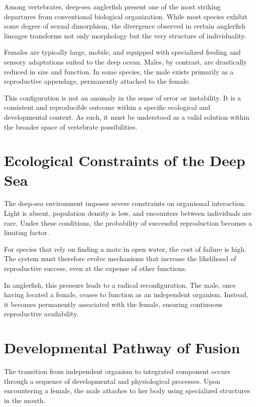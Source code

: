 \documentclass[11pt,oneside]{book}
\begin{document}
Among vertebrates, deep-sea anglerfish present one of the most striking departures from conventional biological organization. While most species exhibit some degree of sexual dimorphism, the divergence observed in certain anglerfish lineages transforms not only morphology but the very structure of individuality.

Females are typically large, mobile, and equipped with specialized feeding and sensory adaptations suited to the deep ocean. Males, by contrast, are drastically reduced in size and function. In some species, the male exists primarily as a reproductive appendage, permanently attached to the female.

This configuration is not an anomaly in the sense of error or instability. It is a consistent and reproducible outcome within a specific ecological and developmental context. As such, it must be understood as a valid solution within the broader space of vertebrate possibilities.

\section{Ecological Constraints of the Deep Sea}

The deep-sea environment imposes severe constraints on organismal interaction. Light is absent, population density is low, and encounters between individuals are rare. Under these conditions, the probability of successful reproduction becomes a limiting factor.

For species that rely on finding a mate in open water, the cost of failure is high. The system must therefore evolve mechanisms that increase the likelihood of reproductive success, even at the expense of other functions.

In anglerfish, this pressure leads to a radical reconfiguration. The male, once having located a female, ceases to function as an independent organism. Instead, it becomes permanently associated with the female, ensuring continuous reproductive availability.

\section{Developmental Pathway of Fusion}

The transition from independent organism to integrated component occurs through a sequence of developmental and physiological processes. Upon encountering a female, the male attaches to her body using specialized structures in the mouth.
\end{document}
